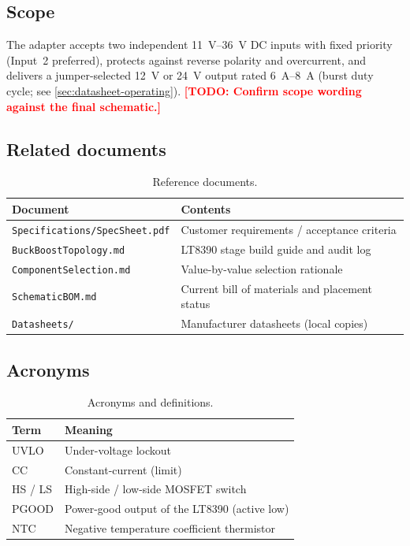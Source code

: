 \documentclass[11pt,a4paper]{article}
\newcommand{\todo}[1]{\textcolor{red}{\textbf{[TODO: #1]}}}
\begin{document}
\subsection{Scope}
The adapter accepts two independent \SIrange{11}{36}{\V} DC inputs with fixed
priority (Input~2 preferred), protects against reverse polarity and overcurrent,
and delivers a jumper-selected \SI{12}{\V} or \SI{24}{\V} output rated
\SIrange{6}{8}{\A} (burst duty cycle; see \autoref{sec:datasheet-operating}).
\newline
\todo{Confirm scope wording against the final schematic.}

\subsection{Related documents}
\begin{table}[H]
  \centering
  \begin{tabularx}{\linewidth}{@{}lX@{}}
    \toprule
    \textbf{Document} & \textbf{Contents} \\
    \midrule
    \texttt{Specifications/SpecSheet.pdf}   & Customer requirements / acceptance criteria \\
    \texttt{BuckBoostTopology.md}           & LT8390 stage build guide and audit log \\
    \texttt{ComponentSelection.md}          & Value-by-value selection rationale \\
    \texttt{SchematicBOM.md}                & Current bill of materials and placement status \\
    \texttt{Datasheets/}                    & Manufacturer datasheets (local copies) \\
    \bottomrule
  \end{tabularx}
  \caption{Reference documents.}
  \label{tab:related-docs}
\end{table}

\subsection{Acronyms}
\begin{table}[H]
  \centering
  \begin{tabularx}{\linewidth}{@{}lX@{}}
    \toprule
    \textbf{Term} & \textbf{Meaning} \\
    \midrule
    UVLO    & Under-voltage lockout \\
    CC      & Constant-current (limit) \\
    HS / LS & High-side / low-side MOSFET switch \\
    PGOOD   & Power-good output of the LT8390 (active low) \\
    NTC     & Negative temperature coefficient thermistor \\
    \bottomrule
  \end{tabularx}
  \caption{Acronyms and definitions.}
\end{table}
\end{document}
